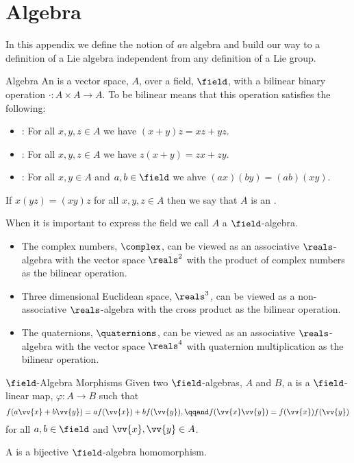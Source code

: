 \chapter{Algebra}
In this appendix we define the notion of \emph{an} algebra and build our way to a definition of a Lie algebra independent from any definition of a Lie group.

\begin{dfn}{Algebra}{}
    An  is a vector space, \(A\), over a field, \(\field\), with a bilinear binary operation \(\cdot \colon A \times A \to A\).
    To be bilinear means that this operation satisfies the following:
    \begin{itemize}
        \item {}: For all \(x, y, z \in A\) we have \((x + y) z = xz + yz\).
        \item {}: For all \(x, y, z \in A\) we have \(z(x + y) = zx + zy\).
        \item {}: For all \(x, y \in A\) and \(a, b \in \field\) we ahve \((ax)(by) = (ab)(xy)\).
    \end{itemize}
    
    If \(x(yz) = (xy)z\) for all \(x, y, z \in A\) then we say that \(A\) is an .
\end{dfn}
When it is important to express the field we call \(A\) a \(\field\)-algebra.

\begin{exm}{}{}
    \begin{itemize}
        \item The complex numbers, \(\complex\), can be viewed as an associative \(\reals\)-algebra with the vector space \(\reals^2\) with the product of complex numbers as the bilinear operation.
        \item Three dimensional Euclidean space, \(\reals^3\), can be viewed as a non-associative \(\reals\)-algebra with the cross product as the bilinear operation.
        \item The quaternions, \(\quaternions\), can be viewed as an associative \(\reals\)-algebra with the vector space \(\reals^4\) with quaternion multiplication as the bilinear operation.
    \end{itemize}
\end{exm}

\begin{dfn}{\(\field\)-Algebra Morphisms}{}
    Given two \(\field\)-algebras, \(A\) and \(B\), a  is a \(\field\)-linear map, \(\varphi\colon A \to B\) such that
    \begin{equation}
        f(a\vv{x} + b\vv{y}) = af(\vv{x}) + bf(\vv{y}), \qqand f(\vv{x}\vv{y}) = f(\vv{x})f(\vv{y})
    \end{equation}
    for all \(a, b \in \field\) and \(\vv{x}, \vv{y} \in A\).
    
    A  is a bijective \(\field\)-algebra homomorphism.
\end{dfn}

